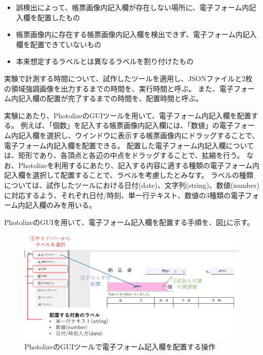 \begin{itemize}
    \item 誤検出によって、帳票画像内記入欄が存在しない場所に、電子フォーム内記入欄を配置したもの
    \item 帳票画像内に存在する帳票画像内記入欄を検出できず、電子フォーム内記入欄を配置できていないもの
    \item 本来想定するラベルとは異なるラベルを割り付けたもの
\end{itemize}

実験で計測する時間について、試作したツールを適用し、JSONファイルと2枚の領域強調画像を出力するまでの時間を、実行時間と呼ぶ。
また、電子フォーム内記入欄の配置が完了するまでの時間を、配置時間と呼ぶ。

実験にあたり、PhotolizeのGUIツールを用いて、電子フォーム内記入欄を配置する。
例えば、「個数」を記入する帳票画像内記入欄には、「数値」の電子フォーム内記入欄を選択し、ウインドウに表示する帳票画像内にドラッグすることで、電子フォーム内記入欄を配置できる。
配置した電子フォーム内記入欄については、矩形であり、各頂点と各辺の中点をドラッグすることで、拡縮を行う。
なお、Photolizeを利用するにあたり、記入する内容に適する種類の電子フォーム内記入欄を選択して配置することで、ラベルを考慮したとみなす。
ラベルの種類については、試作したツールにおける日付(date)、文字列(string)、数値(number)に対応するよう、それぞれ日付/時刻、単一行テキスト、数値の3種類の電子フォーム内記入欄のみを用いる。

PhotolizeのGUIを用いて、電子フォーム記入欄を配置する手順を、図\ref{fig:photolize_how_to_use}に示す。

\begin{figure}[tp]
    \begin{center}
        \includegraphics[width=15cm]{image/06-discussion/photolize_how_to_use.jpg}
        \caption{PhotolizeのGUIツールで電子フォーム記入欄を配置する操作}
        \label{fig:photolize_how_to_use}
    \end{center}
\end{figure}

